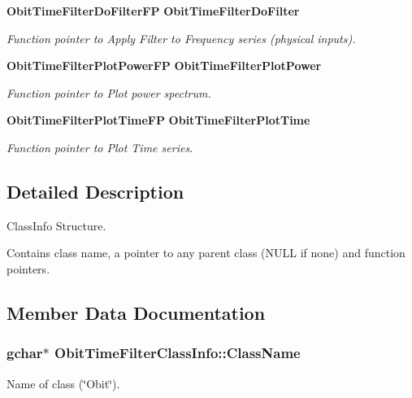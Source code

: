 \begin{CompactItemize}
{\bf Obit\-Time\-Filter\-Do\-Filter\-FP} {\bf Obit\-Time\-Filter\-Do\-Filter}
\begin{CompactList}\small\item\em Function pointer to Apply Filter to Frequency series (physical inputs). \item\end{CompactList}\item 
{\bf Obit\-Time\-Filter\-Plot\-Power\-FP} {\bf Obit\-Time\-Filter\-Plot\-Power}
\begin{CompactList}\small\item\em Function pointer to Plot power spectrum. \item\end{CompactList}\item 
{\bf Obit\-Time\-Filter\-Plot\-Time\-FP} {\bf Obit\-Time\-Filter\-Plot\-Time}
\begin{CompactList}\small\item\em Function pointer to Plot Time series. \item\end{CompactList}\end{CompactItemize}


\subsection{Detailed Description}
Class\-Info Structure. 

Contains class name, a pointer to any parent class (NULL if none) and function pointers. 



\subsection{Member Data Documentation}
\subsubsection{\setlength{\rightskip}{0pt plus 5cm}gchar$\ast$ {\bf Obit\-Time\-Filter\-Class\-Info::Class\-Name}}\label{structObitTimeFilterClassInfo_o2}


Name of class (\char`\"{}Obit\char`\"{}). 

